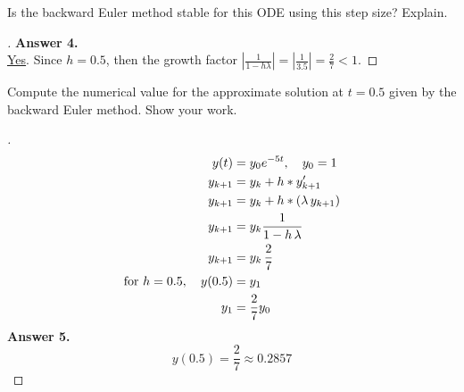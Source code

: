 \documentclass[12pt]{article}
\newenvironment{exercise}[2][Exercise]{\begin{trivlist}
\item[\hskip \labelsep {\bfseries #1}\hskip \labelsep {\bfseries #2.}]}{\end{trivlist}}
\begin{document}
\pagebreak
\begin{exercise}{4}
	Is the backward Euler method stable for this ODE using this step size? Explain.
\end{exercise} 
\begin{proof}[] \vspace{-2mm}
	\textbf{Answer 4.} \\ %
	\underline{Yes}. Since $h=0.5$, then the growth factor $|\frac{1}{1 - h \lambda} | = |\frac{1}{3.5}| = \frac{2}{7} < 1$. 
\end{proof}

\vspace{10mm}
\begin{exercise}{5}
	Compute the numerical value for the approximate solution at $t=0.5$ given by the backward Euler method. Show your work.
\end{exercise} 
\begin{proof}[] \vspace{-2mm}
	\begin{align*}
		y(t) &= y_0 e^{-5t}, \quad y_0 = 1 \\
		y_{k+1} &= y_k + h * y_{k+1}' \\
		y_{k+1} &= y_k + h * (\lambda \, y_{k+1}) \\
		y_{k+1} &= y_k \frac{1}{1 - h \, \lambda}\\
		y_{k+1} &= y_k \, \frac{2}{7}\\
		\textnormal{for } h = 0.5, \quad y(0.5) &= y_1 \\
		y_1 &= \frac{2}{7} y_0
	\end{align*}
	\textbf{Answer 5.}  \vspace{-7mm} \\
	\[ \boxed{ y(0.5) = \frac{2}{7} \approx 0.2857  } \]
\end{proof}
\end{document}
